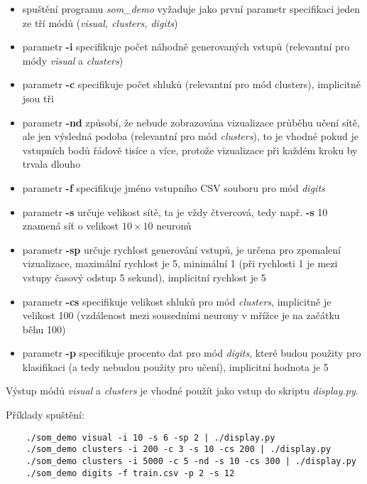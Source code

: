 \documentclass[12pt]{article}
\begin{document}
\begin{itemize}
	\item spuštění programu \textit{som\_demo} vyžaduje jako první parametr specifikaci jeden ze tří módů (\textit{visual, clusters, digits})
	\item parametr \textbf{-i} specifikuje počet náhodně generovaných vstupů (relevantní pro módy \textit{visual} a \textit{clusters})
	\item parametr \textbf{-c} specifikuje počet shluků (relevantní pro mód clusters), implicitně jsou tři
	\item parametr \textbf{-nd} způsobí, že nebude zobrazována vizualizace průběhu učení sítě, ale jen výsledná podoba (relevantní pro mód \textit{clusters}), to je vhodné pokud je vstupních bodů řádově tisíce a více, protože vizualizace při každém kroku by trvala dlouho
	\item parametr \textbf{-f} specifikuje jméno vstupního CSV souboru pro mód \textit{digits}
	\item parametr \textbf{-s} určuje velikost sítě, ta je vždy čtvercová, tedy např. \textbf{-s} 10 znamená síť o velikost $10\times10$ neuronů
	\item parametr \textbf{-sp} určuje rychlost generování vstupů, je určena pro zpomalení vizualizace, maximální rychlost je 5, minimální 1 (při rychlosti 1 je mezi vstupy časový odstup 5 sekund), implicitní rychlost je 5
	\item parametr \textbf{-cs} specifikuje velikost shluků pro mód \textit{clusters}, implicitně je velikost 100 (vzdálenost mezi sousedními neurony v mřížce je na začátku běhu 100)
	\item parametr \textbf{-p} specifikuje procento dat pro mód \textit{digits}, které budou použity pro klasifikaci (a tedy nebudou použity pro učení), implicitní hodnota je 5
\end{itemize}

Výstup módů \textit{visual} a \textit{clusters} je vhodné použít jako vstup do skriptu \textit{display.py}.

Příklady spuštění:
\begin{commandline}
	\begin{verbatim}
	./som_demo visual -i 10 -s 6 -sp 2 | ./display.py
	./som_demo clusters -i 200 -c 3 -s 10 -cs 200 | ./display.py
	./som_demo clusters -i 5000 -c 5 -nd -s 10 -cs 300 | ./display.py 
	./som_demo digits -f train.csv -p 2 -s 12
	\end{verbatim}
\end{commandline}
\end{document}
